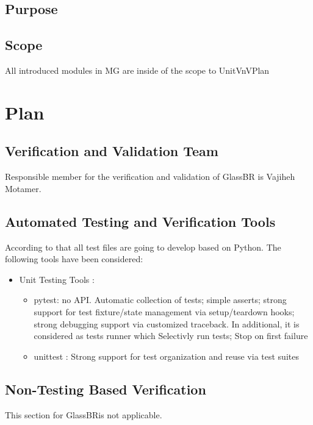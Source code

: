 \documentclass[12pt]{article}
\newcommand{\progname}{GlassBR}
\begin{document}
\subsection{Purpose}


\subsection{Scope}
All introduced modules in MG are inside of the scope to UnitVnVPlan



\section{Plan}
	
\subsection{Verification and Validation Team}
Responsible member for the verification and validation of GlassBR is Vajiheh Motamer.


\subsection{Automated Testing and Verification Tools}
According to that all test files are going to develop based on Python. The following tools have been considered:
\begin{itemize}
	\item Unit Testing Tools :
	\begin{itemize}
		\item pytest:  no API. Automatic collection of tests; simple asserts; strong support for test fixture/state management via setup/teardown hooks; strong debugging support via customized traceback. In additional, it is considered as tests runner which Selectivly run tests; Stop on first failure 
		\item unittest : Strong support for test organization and reuse via test suites 
		 \end{itemize}
	 \end{itemize}


\subsection{Non-Testing Based Verification}
This section for \progname is not applicable.
\end{document}
